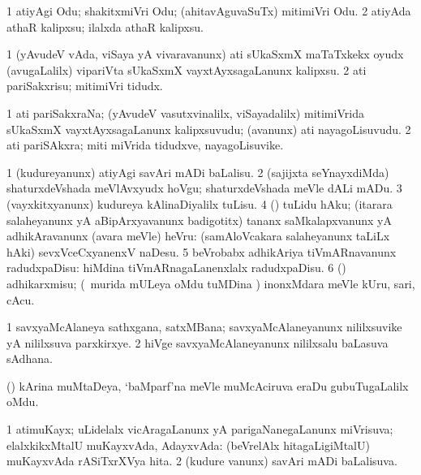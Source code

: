 \bentry
{}
\gl{\sakirx}
\bmng
\bnum
\num{1} atiyAgi Odu; shakitxmiVri Odu; (ahitavAguvaSuTx) mitimiVri Odu.
\num{2} atiyAda athaR kalipxsu; ilalxda athaR kalipxsu. 
\enum
\emng
\eentry


\bentry
{}
\gl{\sakirx}
\bmng
\bnum
\num{1} (yAvudeV vAda, viSaya yA vivaravanunx) ati sUkaSxmX maTaTxkekx oyudx (avugaLalilx) vipariVta sUkaSxmX vayxtAyxsagaLanunx kalipxsu. 
\num{2} ati pariSakxrisu; mitimiVri tidudx. 
\enum
\emng
\eentry


\bentry
{}
\gl{\nA}
\bmng
\bnum
\num{1} ati pariSakxraNa; (yAvudeV vasutxvinalilx, viSayadalilx) mitimiVrida sUkaSxmX vayxtAyxsagaLanunx kalipxsuvudu; (avanunx) ati nayagoLisuvudu. 
\num{2} ati pariSAkxra; miti miVrida tidudxve, nayagoLisuvike. 
\enum
\emng
\eentry


\bentry
{}
\gl{\sakirx}
\bmng
\bnum
\num{1} (kudureyanunx) atiyAgi savAri mADi baLalisu. 
\num{2} (sajijxta seYnayxdiMda) shaturxdeVshada meVlAvxyudx hoVgu; shaturxdeVshada meVle dALi mADu. 
\num{3} (vayxkitxyanunx) kudureya kAlinaDiyalilx tuLisu. 
\num{4} (\rUpa) tuLidu hAku; (itarara salaheyanunx yA aBipArxyavanunx badigotitx) tananx saMkalapxvanunx yA adhikAravanunx (avara meVle) heVru:  (samAloVcakara salaheyanunx taLiLx hAki) sevxVceCxyanenxV naDesu. 
\num{5} beVrobabx adhikAriya tiVmARnavanunx radudxpaDisu:  hiMdina tiVmARnagaLanenxlalx radudxpaDisu. 
\num{6} (\shaveY) adhikarxmisu; (\sA\ murida mULeya oMdu tuMDina \vi) inonxMdara meVle kUru, sari, cAcu. 
\enum
\emng
\eentry

\bentry
{}
\gl{\nA}
\bmng
\bnum
\num{1} savxyaMcAlaneya sathxgana, satxMBana; savxyaMcAlaneyanunx nililxsuvike yA nililxsuva parxkirxye. 
\num{2} hiVge savxyaMcAlaneyanunx nililxsalu baLasuva sAdhana. 
\enum
\emng
\eentry


\bentry
{}
\gl{\nA}
\bmng
(\birx) kArina muMtaDeya, `baMparf'na meVle muMcAciruva eraDu gubuTugaLalilx oMdu. 
\emng
\eentry


\bentry
{}
\gl{\gu}
\bmng
\bnum
\num{1} atimuKayx; uLidelalx vicAragaLanunx yA parigaNanegaLanunx miVrisuva; elalxkikxMtalU muKayxvAda, AdayxvAda:  (beVrelAlx hitagaLigiMtalU) muKayxvAda rASiTxrXVya hita. 
\num{2} (kudure \mo vanunx) savAri mADi baLalisuva. 
\enum
\emng
\eentry


